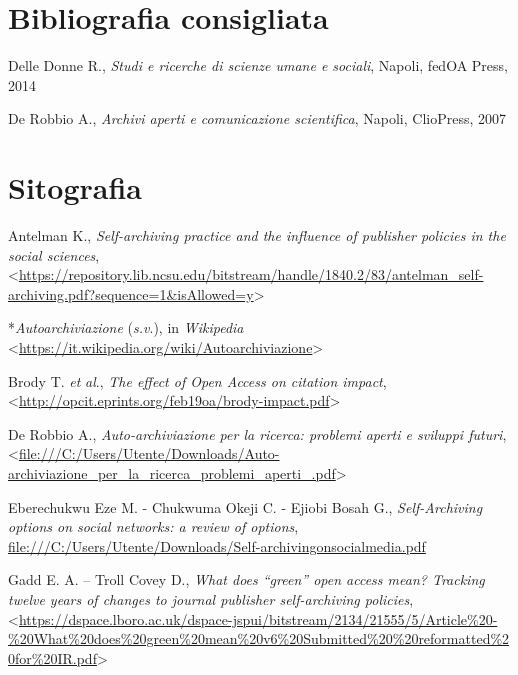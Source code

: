 \documentclass[
  b5paper,
  twoside,
  11pt,
  chapterprefix=false,
  bibliography=totocnumbered,
  listof=flat]{scrbook}
\begin{document}
\hypertarget{bibliografia-consigliata-21}{%
\section*{Bibliografia consigliata}\label{bibliografia-consigliata-21}}

Delle Donne R., \emph{Studi e ricerche di scienze umane e sociali}, Napoli,
fedOA Press, 2014

De Robbio A., \emph{Archivi aperti e comunicazione scientifica}, Napoli,
ClioPress, 2007

\hypertarget{sitografia-25}{%
\section*{Sitografia}\label{sitografia-25}}

Antelman K., \emph{Self-archiving practice and the influence of publisher
policies in the social sciences},
\textless{}\href{https://repository.lib.ncsu.edu/bitstream/handle/1840.2/83/antelman_self-archiving.pdf?sequence=1\&isAllowed=y}{{https://repository.lib.ncsu.edu/bitstream/handle/1840.2/83/antelman\_self-archiving.pdf?sequence=1\&isAllowed=y}}\textgreater{}

*\emph{Autoarchiviazione} (\emph{s.v}.), in \emph{Wikipedia}
\textless{}\href{https://it.wikipedia.org/wiki/Autoarchiviazione}{{https://it.wikipedia.org/wiki/Autoarchiviazione}}\textgreater{}

Brody T. \emph{et} \emph{al}., \emph{The effect of Open Access on citation impact},
\textless{}\href{http://opcit.eprints.org/feb19oa/brody-impact.pdf}{{http://opcit.eprints.org/feb19oa/brody-impact.pdf}}\textgreater{}

De Robbio A., \emph{Auto-archiviazione per la ricerca: problemi aperti e
sviluppi futuri},
\textless{}\href{file:///C:/Users/Utente/Downloads/Auto-archiviazione_per_la_ricerca_problemi_aperti_.pdf}{{file:///C:/Users/Utente/Downloads/Auto-archiviazione\_per\_la\_ricerca\_problemi\_aperti\_.pdf}}\textgreater{}

Eberechukwu Eze M. - Chukwuma Okeji C. - Ejiobi Bosah G.,
\emph{Self-Archiving options on social networks: a review of options},
\href{file:///C:/Users/Utente/Downloads/Self-archivingonsocialmedia.pdf}{{file:///C:/Users/Utente/Downloads/Self-archivingonsocialmedia.pdf}}

Gadd E. A. -- Troll Covey D., \emph{What does \enquote{green} open access mean?
Tracking twelve years of changes to journal publisher self-archiving
policies},
\textless{}\href{https://dspace.lboro.ac.uk/dspace-jspui/bitstream/2134/21555/5/Article\%20-\%20What\%20does\%20green\%20mean\%20v6\%20Submitted\%20\%20reformatted\%20for\%20IR.pdf}{{https://dspace.lboro.ac.uk/dspace-jspui/bitstream/2134/21555/5/Article\%20-\%20What\%20does\%20green\%20mean\%20v6\%20Submitted\%20\%20reformatted\%20for\%20IR.pdf}}\textgreater{}
\end{document}

